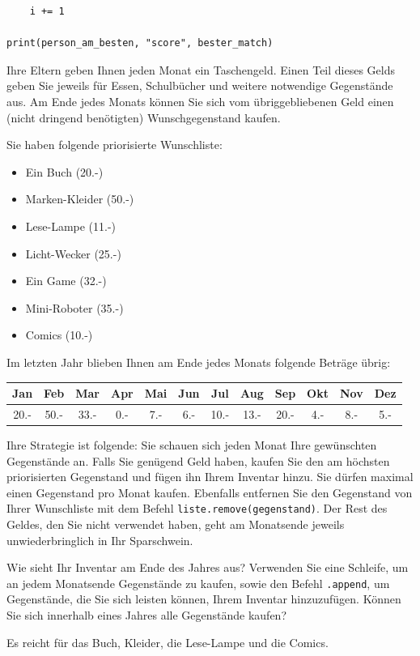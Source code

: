 \begin{questions}
\begin{parts}
\begin{solution}
\begin{lstlisting}
    i += 1

print(person_am_besten, "score", bester_match)
\end{lstlisting}
	\end{solution}
\end{parts}
\droptotalpoints

\clearpage
{}

Ihre Eltern geben Ihnen jeden Monat ein Taschengeld. Einen Teil dieses Gelds geben Sie jeweils für Essen, Schulbücher und weitere notwendige Gegenstände aus. Am Ende jedes Monats können Sie sich vom übriggebliebenen Geld einen (nicht dringend benötigten) Wunschgegenstand kaufen.

Sie haben folgende priorisierte Wunschliste:
\begin{itemize}
	\item Ein Buch (20.-)
	\item Marken-Kleider (50.-)
	\item Lese-Lampe (11.-)
	\item Licht-Wecker (25.-)
	\item Ein Game (32.-)
	\item Mini-Roboter (35.-)
	\item Comics (10.-)
\end{itemize}

Im letzten Jahr blieben Ihnen am Ende jedes Monats folgende Beträge übrig:
\begin{table}[H]
	\centering
	\begin{tabular}{cccccccccccc}
	Jan & Feb & Mar & Apr & Mai & Jun & Jul & Aug & Sep & Okt & Nov & Dez \\\midrule
	20.- & 50.- & 33.- & 0.- & 7.- & 6.- & 10.- & 13.- & 20.- & 4.- & 8.- & 5.-
	\end{tabular}
\end{table}

Ihre Strategie ist folgende: Sie schauen sich jeden Monat Ihre gewünschten Gegenstände an. Falls Sie genügend Geld haben, kaufen Sie den am höchsten priorisierten Gegenstand und fügen ihn Ihrem Inventar hinzu. Sie dürfen maximal einen Gegenstand pro Monat kaufen. Ebenfalls entfernen Sie den Gegenstand von Ihrer Wunschliste mit dem Befehl \lstinline|liste.remove(gegenstand)|. Der Rest des Geldes, den Sie nicht verwendet haben, geht am Monatsende jeweils unwiederbringlich in Ihr Sparschwein.

Wie sieht Ihr Inventar am Ende des Jahres aus? Verwenden Sie eine Schleife, um an jedem Monatsende Gegenstände zu kaufen, sowie den Befehl \lstinline|.append|, um Gegenstände, die Sie sich leisten können, Ihrem Inventar hinzuzufügen. Können Sie sich innerhalb eines Jahres alle Gegenstände kaufen?
	\begin{solution}
		Es reicht für das Buch, Kleider, die Lese-Lampe und die Comics.


\end{solution}
\end{questions}
